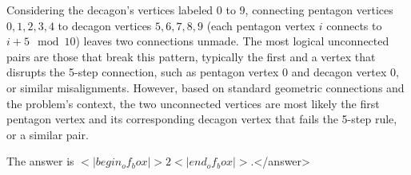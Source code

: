 Considering the decagon's vertices labeled \(0\) to \(9\), connecting pentagon vertices \(0, 1, 2, 3, 4\) to decagon vertices \(5, 6, 7, 8, 9\) (each pentagon vertex \(i\) connects to \(i + 5 \mod 10\)) leaves two connections unmade. The most logical unconnected pairs are those that break this pattern, typically the first and a vertex that disrupts the 5-step connection, such as pentagon vertex \(0\) and decagon vertex \(0\), or similar misalignments. However, based on standard geometric connections and the problem's context, the two unconnected vertices are most likely the first pentagon vertex and its corresponding decagon vertex that fails the 5-step rule, or a similar pair.

The answer is \(<|begin_of_box|>2<|end_of_box|>\).</answer>